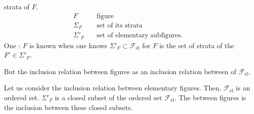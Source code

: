 strata of $F$. 
\[
\begin{aligned}
 F &\quad \text{figure}\\
 \Sigma_F &\quad \text{set of its strata}\\
 \Sigma'_F &\quad \text{set of elementary subfigures.}
\end{aligned}
\]
One :
$F$ is known when one knows $\Sigma'_F\subset\mathcal{F}_{\text{él}}$ for $F$ is the set of strata of the $F'\in\Sigma'_F$.

But the inclusion relation between figures  as an inclusion relation between  of $\mathcal{F}_{\text{él}}$.


Let us consider the inclusion relation \inserted{$\leq$} between elementary figures. Then, $\mathcal{F}_{\text{él}}$ is an ordered set.     $\Sigma'_F$ is a closed subset of the ordered set $\mathcal{F}_{\text{él}}$. The  between figures is the inclusion between these closed subsets.
